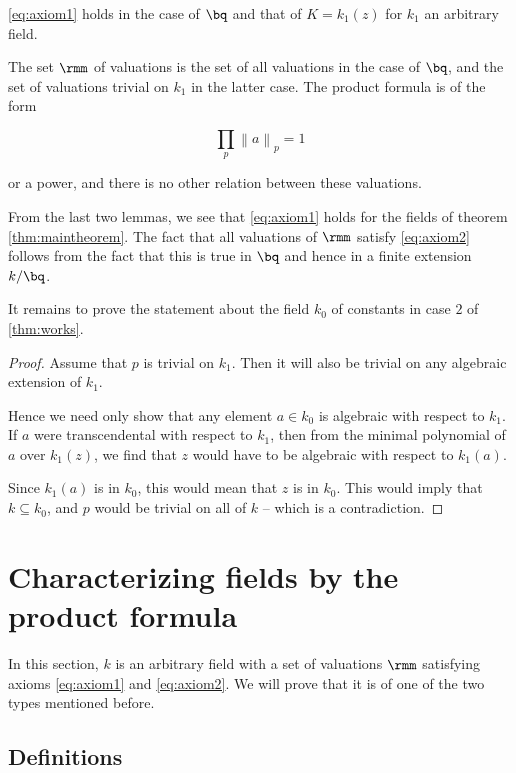 \begin{thm}
  \ref{eq:axiom1} holds in the case of $\bq$ and that of $K=k_1(z)$ for $k_1$ an
  arbitrary field.
\end{thm}

The set $\rmm$ of valuations is the set of all valuations in the case of
$\bq$, and the set of valuations trivial on $k_1$ in the latter case. The
product formula is of the form

\[ \prod_p {\left\lVert a \right\rVert}_p = 1 \]

or a power, and there is no other relation between these valuations.

From the last two lemmas, we see that \ref{eq:axiom1} holds for the fields of
theorem \ref{thm:maintheorem}. The fact that all valuations of $\rmm$ satisfy
\ref{eq:axiom2} follows from the fact that this is true in $\bq$ and hence in a
finite extension $k/\bq$.

It remains to prove the statement about the field $k_0$ of constants in case $2$
of \ref{thm:works}.

\begin{proof}
  Assume that $p$ is trivial on $k_1$. Then it will also be trivial on any
  algebraic extension of $k_1$.

  Hence we need only show that any element $a \in k_0$ is algebraic with respect
  to $k_1$. If $a$ were transcendental with respect to $k_1$, then from the
  minimal polynomial of $a$ over $k_1(z)$, we find that $z$ would have to be
  algebraic with respect to $k_1(a)$.

  Since $k_1(a)$ is in $k_0$, this would mean that $z$ is in $k_0$. This would
  imply that $k\subseteq k_0$, and $p$ would be trivial on all of $k$ -- which
  is a contradiction.
\end{proof}



\section{Characterizing fields by the product formula}

In this section, $k$ is an arbitrary field with a set of valuations $\rmm$
satisfying axioms \ref{eq:axiom1} and \ref{eq:axiom2}. We will prove that it is
of one of the two types mentioned before.

\subsection{Definitions}

